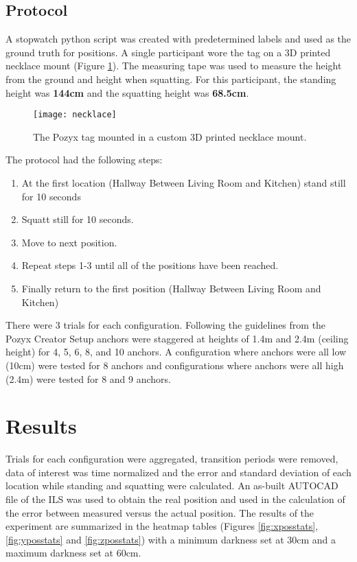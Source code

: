 \clearpage
\subsection{Protocol}
A stopwatch python script was created with predetermined labels and used as the ground truth 
for positions. A single participant wore the tag on a 3D printed necklace mount (Figure \ref{fig:necklace}). 
The measuring tape was used to measure the height from the ground and height when squatting.
For this participant, the standing height was \textbf{144cm} and the squatting height was \textbf{68.5cm}.

\begin{figure}[ht]
    \centering
    \texttt{[image: necklace]}
    \caption{The Pozyx tag mounted in a custom 3D printed necklace mount.}
    \label{fig:necklace}
\end{figure}

The protocol had the following steps:
\begin{enumerate}
    \item At the first location (Hallway Between Living Room and Kitchen) stand still for 10 seconds
    \item Squatt still for 10 seconds.
    \item Move to next position.
    \item Repeat steps 1-3 until all of the positions have been reached.
    \item Finally return to the first position (Hallway Between Living Room and Kitchen)
\end{enumerate}

There were 3 trials for each configuration. Following the guidelines from 
the Pozyx Creator Setup \cite{pozyx_configuration_nodate} anchors were 
staggered at heights of 1.4m and 2.4m (ceiling height) for 4, 5, 6, 8, and 10 anchors.
A configuration where anchors were all low (10cm) were tested for 8 anchors and configurations
where anchors were all high (2.4m) were tested for 8 and 9 anchors.

\section{Results}
Trials for each configuration were aggregated, transition periods were removed, 
data of interest was time normalized and the error and standard deviation of each
location while standing and squatting were calculated. An as-built AUTOCAD file of the 
ILS was used to obtain the real position and used in the calculation of the error 
between measured versus the actual position. The results of the experiment are summarized
in the heatmap tables (Figures \ref{fig:xposstats}, \ref{fig:yposstats} and \ref{fig:zposstats}) 
with a minimum darkness set at 30cm and a maximum darkness set at 60cm.

